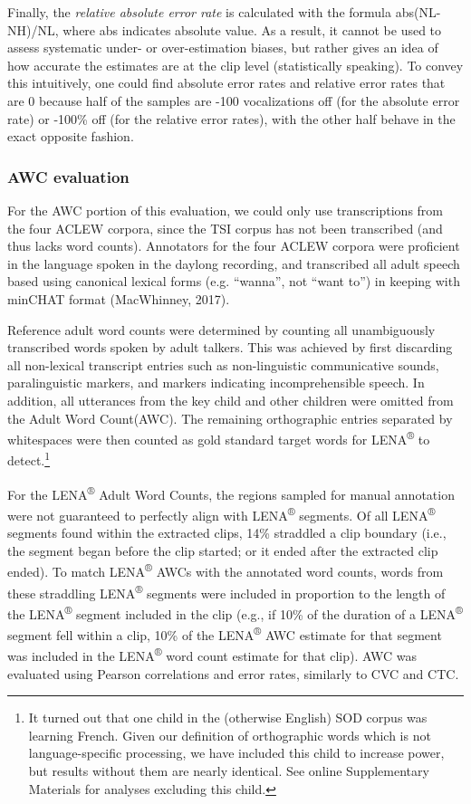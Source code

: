 \documentclass[english,table,man,floatsintext]{apa6}
\begin{document}
Finally, the \emph{relative absolute error rate} is calculated with the formula abs(NL-NH)/NL, where abs indicates absolute value. As a result, it cannot be used to assess systematic under- or over-estimation biases, but rather gives an idea of how accurate the estimates are at the clip level (statistically speaking). To convey this intuitively, one could find absolute error rates and relative error rates that are 0 because half of the samples are -100 vocalizations off (for the absolute error rate) or -100\% off (for the relative error rates), with the other half behave in the exact opposite fashion.

\hypertarget{awc-evaluation}{%
\subsubsection{AWC evaluation}\label{awc-evaluation}}

For the AWC portion of this evaluation, we could only use transcriptions from the four ACLEW corpora, since the TSI corpus has not been transcribed (and thus lacks word counts). Annotators for the four ACLEW corpora were proficient in the language spoken in the daylong recording, and transcribed all adult speech based using canonical lexical forms (e.g. \enquote{wanna}, not \enquote{want to}) in keeping with minCHAT format (MacWhinney, 2017).

Reference adult word counts were determined by counting all unambiguously transcribed words spoken by adult talkers. This was achieved by first discarding all non-lexical transcript entries such as non-linguistic communicative sounds, paralinguistic markers, and markers indicating incomprehensible speech. In addition, all utterances from the key child and other children were omitted from the Adult Word Count(AWC). The remaining orthographic entries separated by whitespaces were then counted as gold standard target words for LENA\textsuperscript{®} to detect.\footnote{It turned out that one child in the (otherwise English) SOD corpus was learning French. Given our definition of orthographic words which is not language-specific processing, we have included this child to increase power, but results without them are nearly identical. See online Supplementary Materials for analyses excluding this child.}

For the LENA\textsuperscript{®} Adult Word Counts, the regions sampled for manual annotation were not guaranteed to perfectly align with LENA\textsuperscript{®} segments. Of all LENA\textsuperscript{®} segments found within the extracted clips, 14\% straddled a clip boundary (i.e., the segment began before the clip started; or it ended after the extracted clip ended). To match LENA\textsuperscript{®} AWCs with the annotated word counts, words from these straddling LENA\textsuperscript{®} segments were included in proportion to the length of the LENA\textsuperscript{®} segment included in the clip (e.g., if 10\% of the duration of a LENA\textsuperscript{®} segment fell within a clip, 10\% of the LENA\textsuperscript{®} AWC estimate for that segment was included in the LENA\textsuperscript{®} word count estimate for that clip). AWC was evaluated using Pearson correlations and error rates, similarly to CVC and CTC.
\end{document}
